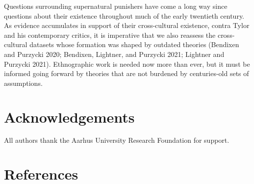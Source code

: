 \documentclass[
]{article}
\begin{document}
Questions surrounding supernatural punishers have come a long way since questions about their existence throughout much of the early twentieth century. As evidence accumulates in support of their cross-cultural existence, contra Tylor and his contemporary critics, it is imperative that we also reassess the cross-cultural datasets whose formation was shaped by outdated theories (Bendixen and Purzycki 2020; Bendixen, Lightner, and Purzycki 2021; Lightner and Purzycki 2021). Ethnographic work is needed now more than ever, but it must be informed going forward by theories that are not burdened by centuries-old sets of assumptions.

\section*{Acknowledgements}

All authors thank the Aarhus University Research Foundation for support.

\section*{References}
\end{document}
